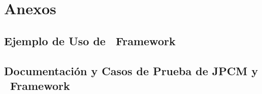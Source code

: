 \documentclass[twoside, openright]{report}
\begin{document}
    \part{Anexos}
        \chapter{Ejemplo de Uso de \nombreFramework \ Framework}
            
        \chapter{Documentación y Casos de Prueba de JPCM y \nombreFramework \ Framework}
            
    
	
	
\end{document}
